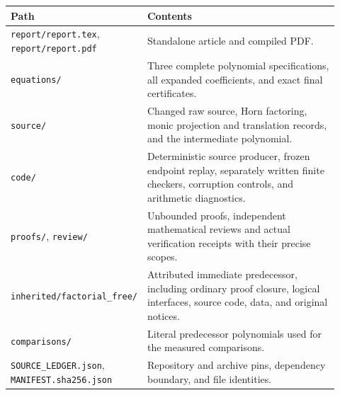 \documentclass[11pt]{article}
\begin{document}
\begin{center}\small
\begin{tabular}{p{0.30\linewidth}p{0.62\linewidth}}
\toprule
Path & Contents\\
\midrule
\nolinkurl{report/report.tex}, \nolinkurl{report/report.pdf}
& Standalone article and compiled PDF.\\
\nolinkurl{equations/}
& Three complete polynomial specifications, all expanded coefficients,
and exact final certificates.\\
\nolinkurl{source/}
& Changed raw source, Horn factoring, monic projection and translation
records, and the intermediate polynomial.\\
\nolinkurl{code/}
& Deterministic source producer, frozen endpoint replay, separately written
finite checkers, corruption controls, and arithmetic diagnostics.\\
\nolinkurl{proofs/}, \nolinkurl{review/}
& Unbounded proofs, independent mathematical reviews and actual verification
receipts with their precise scopes.\\
\nolinkurl{inherited/factorial_free/}
& Attributed immediate predecessor, including ordinary proof closure,
logical interfaces, source code, data, and original notices.\\
\nolinkurl{comparisons/}
& Literal predecessor polynomials used for the measured comparisons.\\
\nolinkurl{SOURCE_LEDGER.json}, \nolinkurl{MANIFEST.sha256.json}
& Repository and archive pins, dependency boundary, and file identities.\\
\bottomrule
\end{tabular}
\end{center}
\end{document}
